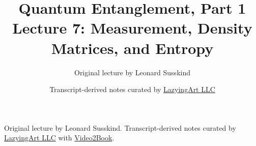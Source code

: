 \documentclass[11pt,oneside]{book}
\begin{document}
\frontmatter
\title{Quantum Entanglement, Part 1\\Lecture 7: Measurement, Density Matrices, and Entropy}
\author{Original lecture by Leonard Susskind}
\date{Transcript-derived notes curated by \href{https://lazying.art}{LazyingArt LLC}}
\maketitle
\begin{center}
\small Original lecture by Leonard Susskind. Transcript-derived notes curated by \href{https://lazying.art}{LazyingArt LLC} with \href{https://github.com/lachlanchen/Video2Book}{Video2Book}.
\end{center}
\clearpage
\mainmatter

\end{document}
